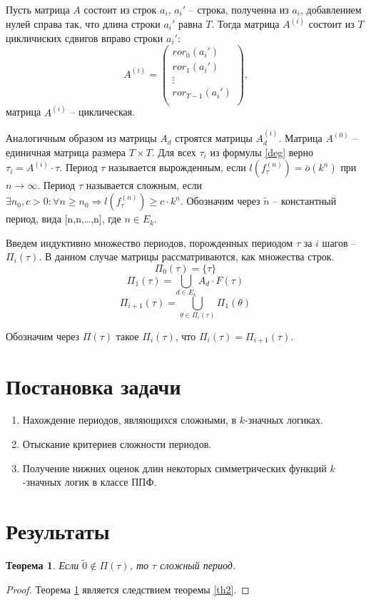 \documentclass[bibliography=totoc, a4paper, 14pt]{extarticle}
\let\stdsection\section
\renewcommand\section{\newpage\stdsection}
\newtheorem{myth}{Теорема}
\begin{document}
Пусть матрица $A$ состоит из строк $a_i$, $a_i'$ -- строка, полученна из $a_i$, добавлением нулей справа так, что
длина строки $a_i'$ равна $T$. Тогда матрица $A^{(i)}$ состоит из $T$ цикличиских сдвигов вправо строки $a_i'$:
$$A^{(i)} = \begin{pmatrix}
ror_0(a_i')     \\
ror_1(a_i')     \\
\vdots          \\
ror_{T-1}(a_i') \\
\end{pmatrix}
\text{,}
$$
матрица $A^{(i)}$ -- циклическая.

Аналогичным образом из матрицы $A_d$ строятся матрицы $A_d^{(i)}$.
Матрица $A^{(0)}$ -- единичная матрица размера $T \times T$.
Для всех $\tau_i$ из формулы \eqref{deg} верно $\tau_i = A^{(i)} \cdot \tau$.
Период $\tau$ называется вырожденным, если $l(f_{\tau}^{(n)}) = \bar{o}(k^n)$ при $n\rightarrow\infty$.
Период $\tau$ называется сложным, если
$\exists n_0, c > 0 : \forall n \geqslant n_0 \Rightarrow l(f_{\tau}^{(n)}) \geqslant c \cdot k^n$.
Обозначим через $\tilde{n}$ -- константный период, вида [n,n,\ldots,n], где $n \in E_k$.

Введем индуктивно множество периодов, порожденных периодом $\tau$ за $i$ шагов -- $\Pi_i(\tau)$.
В данном случае матрицы рассматриваются, как множества строк.
$$\Pi_0(\tau) = \{\tau\}$$
$$\Pi_1(\tau) = \underset{d \in E_k}{\bigcup} A_d \cdot F(\tau)$$
$$\Pi_{i+1}(\tau) = \underset{\theta \in \Pi_i(\tau)}{\bigcup} \Pi_1(\theta)$$

Обозначим через $\Pi(\tau)$ такое $\Pi_i(\tau)$, что $\Pi_i(\tau) = \Pi_{i+1}(\tau)$.

\section{Постановка задачи}
\begin{enumerate}
\item Нахождение периодов, являющихся сложными, в $k$-значных логиках.

\item Отыскание критериев сложности периодов.

\item Получение нижних оценок длин некоторых симметрических функций $k$-значных логик в классе ППФ.
\end{enumerate}

\section{Результаты}
\begin{myth}
\label{th1}
Если $\tilde{0} \not\in \Pi(\tau)$, то $\tau$ сложный период.
\end{myth}
\begin{proof}
Теорема \ref{th1} является следствием теоремы \ref{th2}.
\end{proof}
\end{document}
